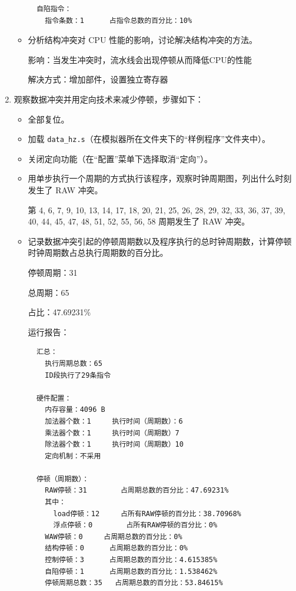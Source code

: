 \documentclass[blue,normal,cn]{elegantnote}
\newcommand{\code}[1]{\colorbox{light-gray}{\texttt{#1}}}
\begin{document}
\begin{enumerate}[wide=0pt, listparindent=2em, parsep=0pt]
\begin{itemize}[leftmargin=3em, listparindent=2em, parsep=0pt]
\begin{lstlisting}
  自陷指令：
    指令条数：1		占指令总数的百分比：10%
\end{lstlisting}
          \item 分析结构冲突对 CPU 性能的影响，讨论解决结构冲突的方法。

                \textcolor{ans}{影响：当发生冲突时，流水线会出现停顿从而降低CPU的性能}

                \textcolor{ans}{解决方式：增加部件，设置独立寄存器}
        \end{itemize}

  \item 观察数据冲突并用定向技术来减少停顿，步骤如下：
        \begin{itemize}[leftmargin=3em, listparindent=2em, parsep=0pt]
          \item 全部复位。
          \item 加载 \code{data\_hz.s}（在模拟器所在文件夹下的“样例程序”文件夹中）。
          \item 关闭定向功能（在“配置”菜单下选择取消“定向”）。
          \item 用单步执行一个周期的方式执行该程序，观察时钟周期图，列出什么时刻发生了 RAW 冲突。

                \textcolor{ans}{第 4, 6, 7, 9, 10, 13, 14, 17, 18, 20, 21, 25, 26, 28, 29, 32, 33, 36, 37, 39, 40, 44, 45, 47, 48, 51, 52, 55, 56, 58 周期发生了 RAW 冲突。}

          \item 记录数据冲突引起的停顿周期数以及程序执行的总时钟周期数，计算停顿时钟周期数占总执行周期数的百分比。

                \textcolor{ans} {停顿周期：31}

                \textcolor{ans} {总周期：65}

                \textcolor{ans} {占比：47.69231\%}

                \textcolor{ans}{运行报告：}
                \begin{lstlisting}
  汇总：
    执行周期总数：65
    ID段执行了29条指令

  硬件配置：
    内存容量：4096 B
    加法器个数：1		执行时间（周期数）：6
    乘法器个数：1		执行时间（周期数）7		
    除法器个数：1		执行时间（周期数）10		
    定向机制：不采用

  停顿（周期数）：
    RAW停顿：31		占周期总数的百分比：47.69231%
    其中：
      load停顿：12		占所有RAW停顿的百分比：38.70968%
      浮点停顿：0		占所有RAW停顿的百分比：0%
    WAW停顿：0		占周期总数的百分比：0%
    结构停顿：0		占周期总数的百分比：0%
    控制停顿：3		占周期总数的百分比：4.615385%
    自陷停顿：1		占周期总数的百分比：1.538462%
    停顿周期总数：35	占周期总数的百分比：53.84615%


\end{lstlisting}
\end{itemize}
\end{enumerate}
\end{document}
